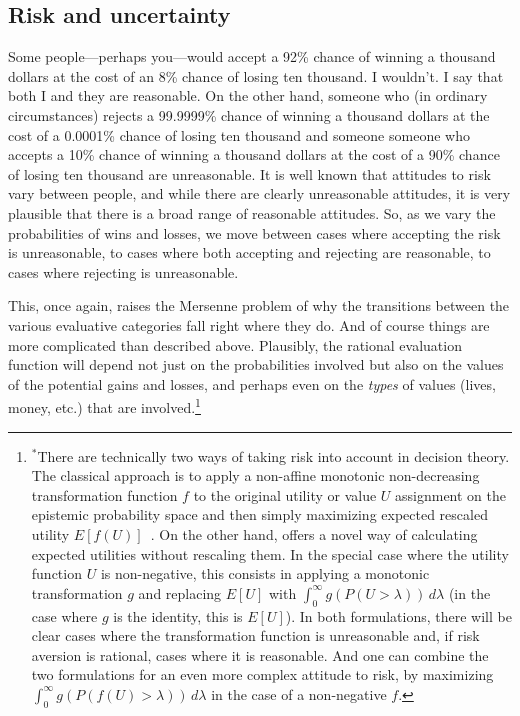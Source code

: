 \subsection{Risk and uncertainty}\label{sec:risk}
Some people---perhaps you---would accept a 92\% chance of winning a thousand dollars at the cost of an 8\% chance
of losing ten thousand. I wouldn't. I say that both I and they are reasonable. On the other hand, someone who 
(in ordinary circumstances) rejects a 99.9999\% chance of winning a thousand dollars at the cost of a 0.0001\% chance
of losing ten thousand and someone someone who accepts a 10\% chance of winning a thousand dollars at the cost of a 90\% chance
of losing ten thousand are unreasonable. 
It is well known that attitudes to risk vary between people, and while there are clearly unreasonable attitudes, it is very plausible
that there is a broad range of reasonable attitudes.
So, as we vary the probabilities of wins and losses, we move between cases
where accepting the risk is unreasonable, to cases where both accepting and rejecting are reasonable, to cases where
rejecting is unreasonable.

This, once again, raises the Mersenne problem of why the transitions between the various evaluative categories fall right where they
do.  And of course things are more complicated than described above. Plausibly, the rational evaluation function 
will depend not just on the probabilities involved but also on the values of the potential gains and losses, and
perhaps even on the \textit{types} of values (lives, money, etc.) that are involved.\footnote{$^*$There are technically two ways of taking risk
into account in decision theory. The classical approach is to apply a non-affine monotonic non-decreasing 
transformation function $f$ to the original utility or value $U$ assignment on the epistemic probability space 
and then simply maximizing expected rescaled 
utility $E[f(U)]$~\parencite[Section~II]{WilkinsonRisk}.
On the other hand,  offers a novel way of calculating expected utilities without rescaling them.
In the special case where the utility function $U$ is non-negative, this consists in applying a monotonic
transformation $g$ and replacing $E[U]$ with $\int_0^\infty g(P(U>\lambda)) \, d\lambda$ (in the case where
$g$ is the identity, this is $E[U]$). In both formulations, there will be clear cases where the 
transformation function is unreasonable and, if risk aversion is rational, cases where it is reasonable. And one
can combine the two formulations for an even more complex attitude to risk, by maximizing 
$\int_0^\infty g(P(f(U)>\lambda)) \, d\lambda$ in the case of a non-negative $f$.}

